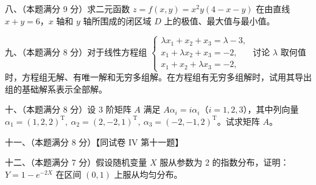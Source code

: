 \documentclass[UTF8,12pt]{ctexart}
\begin{document}
八、（本题满分 9 分）求二元函数 \(\displaystyle z=f(x,\allowbreak y)=x^2y(4-x-y)\) 在由直线 \(\displaystyle x+y=6\)，\(\displaystyle x\) 轴和 \(\displaystyle y\) 轴所围成的闭区域 \(\displaystyle D\) 上的极值、最大值与最小值。


九、（本题满分 8 分）对于线性方程组 \(\displaystyle \begin{cases}\lambda x_1+x_2+x_3=\lambda-3,\allowbreak \\x_1+\lambda x_2+x_3=-2,\allowbreak \\x_1+x_2+\lambda x_3=-2,\allowbreak \end{cases}\) 讨论 \(\displaystyle \lambda\) 取何值时，方程组无解、有唯一解和无穷多组解。在方程组有无穷多组解时，试用其导出组的基础解系表示全部解。


十、（本题满分 8 分）设 3 阶矩阵 \(\displaystyle A\) 满足 \(\displaystyle A\alpha_i=i\alpha_i\)（\(\displaystyle i=1,\allowbreak 2,\allowbreak 3\)），其中列向量 \(\displaystyle \alpha_1=(1,\allowbreak 2,\allowbreak 2)^{\mathrm T},\allowbreak \ \alpha_2=(2,\allowbreak -2,\allowbreak 1)^{\mathrm T},\allowbreak \ \alpha_3=(-2,\allowbreak -1,\allowbreak 2)^{\mathrm T}\)。试求矩阵 \(\displaystyle A\)。


十一、（本题满分 8 分）【同试卷 IV 第十一题】


十二、（本题满分 7 分）假设随机变量 \(\displaystyle X\) 服从参数为 2 的指数分布，证明：\(\displaystyle Y=1-e^{-2X}\) 在区间 \(\displaystyle (0,\allowbreak 1)\) 上服从均匀分布。
\end{document}
